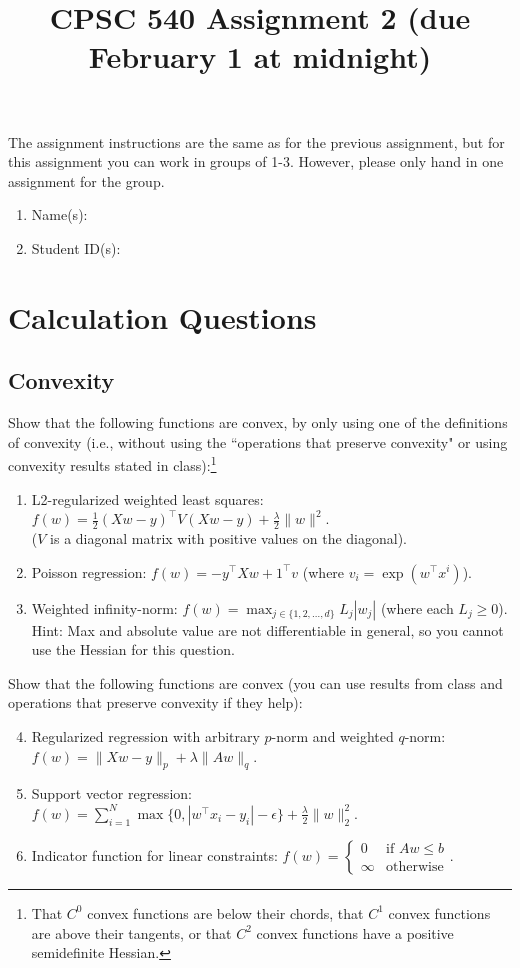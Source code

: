 \documentclass{article}
\def\blu#1{{\color{blu}#1}}
\def\red#1{{\color{red}#1}}
\def\norm#1{\|#1\|}
\def\half{\frac 1 2}
\def\enum#1{\begin{enumerate}#1\end{enumerate}}
\begin{document}
\title{CPSC 540 Assignment 2 (due February 1 at midnight)}
\author{}
\date{}
\maketitle
\vspace{-4em}

The assignment instructions are the same as for the previous assignment, but for this assignment you can work in groups of 1-3. However, please only hand in one assignment for the group.


\blu{\enum{
\item Name(s):
\item Student ID(s):
}}




\section{Calculation Questions}


\subsection{Convexity}

\blu{Show that the following functions are convex, by only using one of the definitions of convexity (i.e., without using the ``operations that preserve convexity" or using convexity results stated in class)}:\footnote{That $C^0$ convex functions are below their chords, that $C^1$ convex functions are above their tangents, or that $C^2$ convex functions have a positive semidefinite Hessian.}
\enum{
\item L2-regularized weighted least squares: $f(w) = \half(Xw - y)^\top V(Xw-y)  + \frac \lambda 2 \norm{w}^2$.\\($V$ is a diagonal matrix with positive values on the diagonal).
\item Poisson regression: $f(w) = -y^\top Xw + 1^\top v$ (where $v_i = \exp(w^\top x^i)$).
\item Weighted infinity-norm: $f(w) = \max_{j \in \{1,2,\dots,d\}}L_j|w_j|$ \red{(where each $L_j \geq 0$)}.\\
Hint: Max and absolute value are not differentiable in general, so you cannot use the Hessian for this question.
}

\blu{Show that the following functions are convex (you can use results from class and operations that preserve convexity if they help)}:
\enum{
\setcounter{enumi}{3}
\item Regularized regression with arbitrary $p$-norm and weighted $q$-norm: $f(w) = \norm{Xw - y}_p + \lambda\norm{Aw}_q$.
\item Support vector regression: $f(w) = \sum_{i=1}^N\max\{0, |w^\top x_i - y_i| - \epsilon\} + \frac{\lambda}{2}\norm{w}_2^2$.
\item Indicator function for linear constraints: $f(w) = \begin{cases}0 & \text{if $Aw \leq b$}\\\infty & \text{otherwise}\end{cases}$.
}
\end{document}
